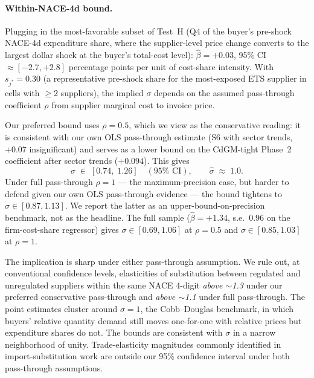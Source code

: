 \paragraph{Within-NACE-4d bound.} Plugging in the most-favorable subset of Test~H (Q4 of the buyer's pre-shock NACE-4d expenditure share, where the supplier-level price change converts to the largest dollar shock at the buyer's total-cost level): $\widehat{\beta} = +0.03$, 95\% CI $\approx [-2.7, +2.8]$ percentage points per unit of cost-share intensity. With $s_{j^*} = 0.30$ (a representative pre-shock share for the most-exposed ETS supplier in cells with $\geq 2$ suppliers), the implied $\sigma$ depends on the assumed pass-through coefficient $\rho$ from supplier marginal cost to invoice price.

Our preferred bound uses $\rho = 0.5$, which we view as the conservative reading: it is consistent with our own OLS pass-through estimate (S6 with sector trends, $+0.07$ insignificant) and serves as a lower bound on the CdGM-tight Phase~2 coefficient after sector trends ($+0.094$). This gives
\[
    \sigma \;\in\; [0.74,\; 1.26]\quad(95\%\text{ CI}),\qquad
    \widehat{\sigma}\;\approx\;1.0.
\]
Under full pass-through $\rho = 1$ --- the maximum-precision case, but harder to defend given our own OLS pass-through evidence --- the bound tightens to $\sigma \in [0.87, 1.13]$. We report the latter as an upper-bound-on-precision benchmark, not as the headline. The full sample ($\widehat{\beta} = +1.34$, s.e.\ $0.96$ on the firm-cost-share regressor) gives $\sigma \in [0.69, 1.06]$ at $\rho = 0.5$ and $\sigma \in [0.85, 1.03]$ at $\rho = 1$.

The implication is sharp under either pass-through assumption. We rule out, at conventional confidence levels, elasticities of substitution between regulated and unregulated suppliers within the same NACE 4-digit \emph{above $\sim$1.3} under our preferred conservative pass-through and \emph{above $\sim$1.1} under full pass-through. The point estimates cluster around $\sigma = 1$, the Cobb--Douglas benchmark, in which buyers' relative quantity demand still moves one-for-one with relative prices but expenditure shares do not. The bounds are consistent with $\sigma$ in a narrow neighborhood of unity. Trade-elasticity magnitudes commonly identified in import-substitution work \citep[e.g.,][with $\sigma \approx 4$]{peter2023} are outside our 95\% confidence interval under both pass-through assumptions.

